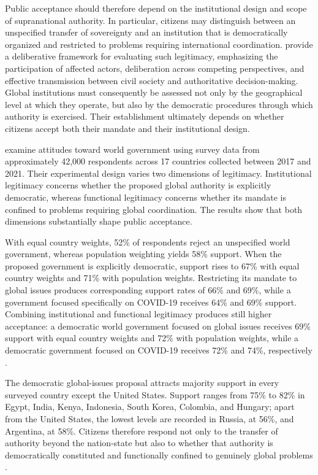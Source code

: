 Public acceptance should therefore depend on the institutional design and scope of supranational authority. In particular, citizens may distinguish between an unspecified transfer of sovereignty and an institution that is democratically organized and restricted to problems requiring international coordination. \citet{dryzek_global_2011} provide a deliberative framework for evaluating such legitimacy, emphasizing the participation of affected actors, deliberation across competing perspectives, and effective transmission between civil society and authoritative decision-making. Global institutions must consequently be assessed not only by the geographical level at which they operate, but also by the democratic procedures through which authority is exercised. Their establishment ultimately depends on whether citizens accept both their mandate and their institutional design.

\citet{ghassim_who_2024} examine attitudes toward world government using survey data from approximately 42,000 respondents across 17 countries collected between 2017 and 2021. %
Their experimental design varies two dimensions of legitimacy. Institutional legitimacy concerns whether the proposed global authority is explicitly democratic, whereas functional legitimacy concerns whether its mandate is confined to problems requiring global coordination. The results show that both dimensions substantially shape %
public acceptance.

With equal country weights, 52\% of respondents reject an unspecified world government, whereas population weighting yields 58\% support. When the proposed government is explicitly democratic, support rises to 67\% with equal country weights and 71\% with population weights. Restricting its mandate to global issues produces corresponding support rates of 66\% and 69\%, while a government focused specifically on COVID-19 receives 64\% and 69\% support. Combining institutional and functional legitimacy produces still higher acceptance: a democratic world government focused on global issues receives 69\% support with equal country weights and 72\% with population weights, while a democratic government focused on COVID-19 receives 72\% and 74\%, respectively \citep{ghassim_who_2024}.

The democratic global-issues proposal attracts majority support in every surveyed country except the United States. Support ranges from 75\% to 82\% in Egypt, India, Kenya, Indonesia, South Korea, Colombia, and Hungary; apart from the United States, the lowest levels are recorded in Russia, at 56\%, and Argentina, at 58\%. Citizens therefore respond not only to the transfer of authority beyond the nation-state but also to whether that authority is democratically constituted and functionally confined to genuinely global problems \citep{ghassim_who_2024}.


